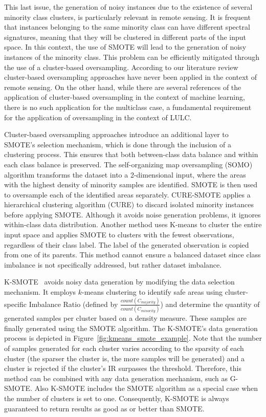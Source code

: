 \documentclass[parskip=full]{scrartcl}
\begin{document}
This last issue, the generation of noisy instances due to the existence of
several minority class clusters, is particularly relevant in remote sensing. It
is frequent that instances belonging to the same minority class can have
different spectral signatures, meaning that they will be clustered in different
parts of the input space. In this context, the use of SMOTE will lead to the
generation of noisy instances of the minority class. This problem can be
efficiently mitigated through the use of a cluster-based oversampling. According
to our literature review cluster-based oversampling approaches have never been
applied in the context of remote sensing. On the other hand, while there are
several references of the application of cluster-based oversampling in the
context of machine learning, there is no such application for the multiclass
case, a fundamental requirement for the application of oversampling in the
context of LULC. 

Cluster-based oversampling approaches introduce an additional layer to
SMOTE's selection mechanism, which is done through the inclusion of a clustering
process. This ensures that both between-class data balance and within each class
balance is preserved. The self-organizing map
oversampling (SOMO) \cite{Douzas2017} algorithm transforms the dataset into a
2-dimensional input, where the areas with the highest density of minority
samples are identified. SMOTE is then used to oversample each of the identified
areas separately. CURE-SMOTE \cite{Ma2017} applies a hierarchical clustering
algorithm (CURE) to discard isolated minority instances before applying SMOTE.
Although it avoids noise generation problems, it ignores within-class data
distribution. Another method \cite{Santos2015} uses K-means to cluster the
entire input space and applies SMOTE to clusters with the fewest observations,
regardless of their class label. The label of the generated observation is
copied from one of its parents. This method cannot ensure a balanced dataset
since class imbalance is not specifically addressed, but rather dataset
imbalance.

K-SMOTE~\cite{Douzas2018} avoids noisy data generation by modifying the data
selection mechanism. It employs $k$-means clustering to identify safe areas
using cluster-specific Imbalance Ratio (defined by
$\frac{count(C_{majority})}{count(C_{minority})}$) and determine the quantity of
generated samples per cluster based on a density measure. These samples are
finally generated using the SMOTE algorithm. The K-SMOTE's data generation
process is depicted in Figure~\ref{fig:kmeans_smote_example}. Note that the
number of samples generated for each cluster varies according to the sparsity of
each cluster (the sparser the cluster is, the more samples will be generated)
and a cluster is rejected if the cluster's IR surpasses the threshold.
Therefore, this method can be combined with any data generation mechanism, such
as G-SMOTE. Also K-SMOTE includes the SMOTE algorithm as a special case when the
number of clusters is set to one. Consequently, K-SMOTE is always guaranteed to
return results as good as or better than SMOTE.
\end{document}
